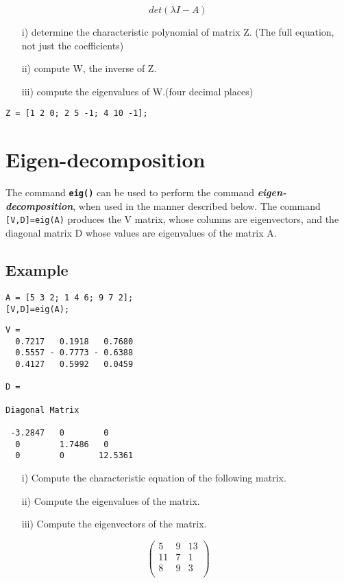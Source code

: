 \documentclass[a4paper,12pt]{article}
\begin{document}
\[det( \lambda I - A )\]

\begin{itemize}
\item[i)] determine the characteristic polynomial of matrix Z. (The full equation, not just the coefficients)
\item[ii)] compute W, the inverse of Z.
\item[iii)] compute the eigenvalues of W.(four decimal places)
\end{itemize}
\begin{framed}
\begin{verbatim}
Z = [1 2 0; 2 5 -1; 4 10 -1];

\end{verbatim}
\end{framed}
\newpage


\section{Eigen-decomposition}
The command \texttt{\textbf{eig()}} can be used to perform the command \textit{\textbf{eigen-decomposition}}, when used in the manner described below. The command \texttt{[V,D]=eig(A)} produces the V matrix, whose columns are eigenvectors, and the diagonal matrix D whose values are eigenvalues of the matrix A.

\subsection{Example}

\begin{framed}
\begin{verbatim}
A = [5 3 2; 1 4 6; 9 7 2];
[V,D]=eig(A);
\end{verbatim}
\end{framed}
\begin{verbatim}
V =
  0.7217   0.1918   0.7680
  0.5557 - 0.7773 - 0.6388
  0.4127   0.5992   0.0459

D =

Diagonal Matrix

 -3.2847   0        0
  0        1.7486   0
  0        0       12.5361
\end{verbatim}

\begin{itemize}
\item[i)] Compute the characteristic equation of the following matrix.
\item[ii)] Compute the eigenvalues of the matrix.
\item[iii)] Compute the eigenvectors of the matrix.
\end{itemize}
\[\left(
\begin{array}{ccc}
5 & 9 & 13 \\
11 & 7 & 1 \\
8 & 9 & 3 \\
\end{array}
\right)\]
\end{document}
